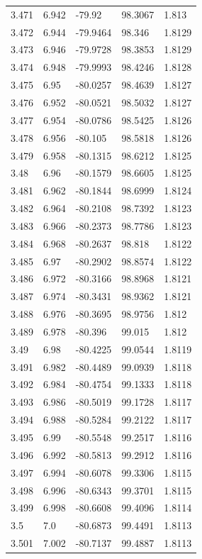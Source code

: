 \begin{tabular}{lllll}
3.471 & 6.942 & -79.92 & 98.3067 & 1.813 \\
3.472 & 6.944 & -79.9464 & 98.346 & 1.8129 \\
3.473 & 6.946 & -79.9728 & 98.3853 & 1.8129 \\
3.474 & 6.948 & -79.9993 & 98.4246 & 1.8128 \\
3.475 & 6.95 & -80.0257 & 98.4639 & 1.8127 \\
3.476 & 6.952 & -80.0521 & 98.5032 & 1.8127 \\
3.477 & 6.954 & -80.0786 & 98.5425 & 1.8126 \\
3.478 & 6.956 & -80.105 & 98.5818 & 1.8126 \\
3.479 & 6.958 & -80.1315 & 98.6212 & 1.8125 \\
3.48 & 6.96 & -80.1579 & 98.6605 & 1.8125 \\
3.481 & 6.962 & -80.1844 & 98.6999 & 1.8124 \\
3.482 & 6.964 & -80.2108 & 98.7392 & 1.8123 \\
3.483 & 6.966 & -80.2373 & 98.7786 & 1.8123 \\
3.484 & 6.968 & -80.2637 & 98.818 & 1.8122 \\
3.485 & 6.97 & -80.2902 & 98.8574 & 1.8122 \\
3.486 & 6.972 & -80.3166 & 98.8968 & 1.8121 \\
3.487 & 6.974 & -80.3431 & 98.9362 & 1.8121 \\
3.488 & 6.976 & -80.3695 & 98.9756 & 1.812 \\
3.489 & 6.978 & -80.396 & 99.015 & 1.812 \\
3.49 & 6.98 & -80.4225 & 99.0544 & 1.8119 \\
3.491 & 6.982 & -80.4489 & 99.0939 & 1.8118 \\
3.492 & 6.984 & -80.4754 & 99.1333 & 1.8118 \\
3.493 & 6.986 & -80.5019 & 99.1728 & 1.8117 \\
3.494 & 6.988 & -80.5284 & 99.2122 & 1.8117 \\
3.495 & 6.99 & -80.5548 & 99.2517 & 1.8116 \\
3.496 & 6.992 & -80.5813 & 99.2912 & 1.8116 \\
3.497 & 6.994 & -80.6078 & 99.3306 & 1.8115 \\
3.498 & 6.996 & -80.6343 & 99.3701 & 1.8115 \\
3.499 & 6.998 & -80.6608 & 99.4096 & 1.8114 \\
3.5 & 7.0 & -80.6873 & 99.4491 & 1.8113 \\
3.501 & 7.002 & -80.7137 & 99.4887 & 1.8113 \\

\end{tabular}
